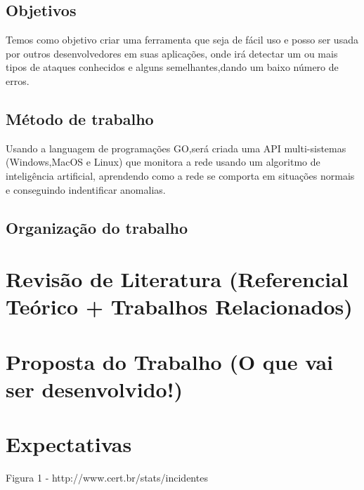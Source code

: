 \documentclass[
	12pt,				%
	openright,			%
	oneside,
	a4paper,			%
	english,			%
	french,				%
	spanish,			%
	brazil				%
	]{abntex2}
\begin{document}
\section{Objetivos}
Temos como objetivo criar uma ferramenta que seja de fácil uso e posso ser usada por outros desenvolvedores em suas aplicações, onde irá detectar um ou mais tipos de ataques conhecidos e alguns semelhantes,dando um baixo número de erros.

\section{Método de trabalho}
Usando a languagem de programações GO,será criada uma API multi-sistemas (Windows,MacOS e Linux) que monitora a rede usando um algoritmo de inteligência artificial, aprendendo como a rede se comporta em situações normais e conseguindo indentificar anomalias.
\section{Organização do trabalho}

\chapter[Revisão de Literatura]{Revisão de Literatura (Referencial Teórico + Trabalhos Relacionados)}

 

\chapter[Proposta do Trabalho]{Proposta do Trabalho (O que vai ser desenvolvido!)}


\chapter[Expectativas]{Expectativas}


\postextual


Figura 1 - http://www.cert.br/stats/incidentes
\end{document}

